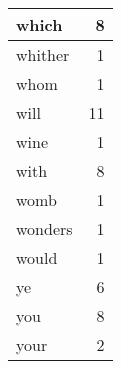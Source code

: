 \begin{center}
\begin{longtable}{l|r}
which & 8 \\ \hline
whither & 1 \\ \hline
whom & 1 \\ \hline
will & 11 \\ \hline
wine & 1 \\ \hline
with & 8 \\ \hline
womb & 1 \\ \hline
wonders & 1 \\ \hline
would & 1 \\ \hline
ye & 6 \\ \hline
you & 8 \\ \hline
your & 2 \\ \hline
\end{longtable}
\end{center}



\normalsize



